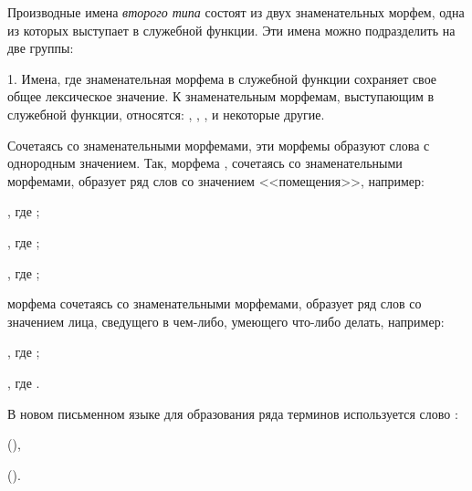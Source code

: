 Производные имена \emph{второго типа} состоят из двух знаменательных морфем, одна из которых выступает в служебной функции. Эти имена можно подразделить на две группы:

1. Имена, где знаменательная морфема в служебной функции сохраняет свое общее лексическое значение. К знаменательным морфемам, выступающим в служебной функции, относятся:
, , ,  и некоторые другие.

Сочетаясь со знаменательными морфемами, эти морфемы образуют слова с однородным значением. Так, морфема , сочетаясь со знаменательными морфемами, образует ряд слов со значением <<помещения>>, например:
\begin{prfsample}
    \item {}, где ;
    \item {}, где ;
    \item {}, где ;
\end{prfsample}
морфема  сочетаясь со знаменательными морфемами, образует ряд слов со значением лица, сведущего в чем-либо, умеющего что-либо делать, например:
\begin{prfsample}
    \item {}, где ;
    \item {}, где .
\end{prfsample}

В новом письменном языке для образования ряда терминов используется слово :
\begin{prfsample}
    \item {} (),
    \item {} ().
\end{prfsample}

